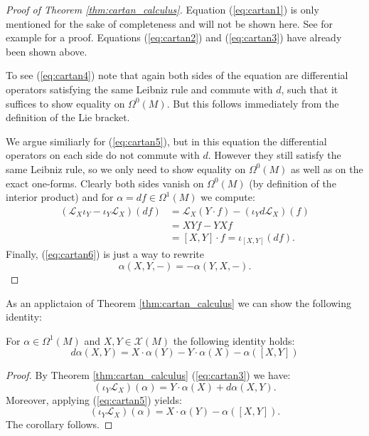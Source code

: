 \begin{proof}[Proof of Theorem \ref{thm:cartan_calculus}]
    Equation (\ref{eq:cartan1}) is only mentioned for the sake of completeness and will not be shown here. See for example \cite{steimle_geometrie} for a proof. Equations (\ref{eq:cartan2}) and (\ref{eq:cartan3}) have already been shown above. 
    
    To see (\ref{eq:cartan4}) note that again both sides of the equation are differential operators satisfying the same Leibniz rule and commute with $d$, such that it suffices to show equality on $\Omega^0(M)$. But this follows immediately from the definition of the Lie bracket.

    We argue similiarly for (\ref{eq:cartan5}), but in this equation the differential operators on each side do not commute with $d$. However they still satisfy the same Leibniz rule, so we only need to show equality on $\Omega^0(M)$ as well as on the exact one-forms. Clearly both sides vanish on $\Omega^0(M)$ (by definition of the interior product) and for $\alpha = df \in \Omega^1(M)$ we compute:
    \begin{align*}
        (\mathcal{L}_X\iota_Y - \iota_Y\mathcal{L}_X)(df) & = \mathcal{L}_X(Y \cdot f) - (\iota_Y d \mathcal{L}_X)(f) \\
        &= XYf - YXf\\
        &= [X,Y] \cdot f = \iota_{[X,Y]}(df).
    \end{align*}
    Finally, (\ref{eq:cartan6}) is just a way to rewrite
    \[
    \alpha(X,Y,-) = -\alpha(Y,X,-).
    \]
\end{proof}

As an applictaion of Theorem \ref{thm:cartan_calculus} we can show the following identity:

\begin{corollary}
    For $\alpha \in \Omega^1(M)$ and $X,Y \in \mathscr{X}(M)$ the following identity holds:
    \[
    d\alpha(X,Y) = X \cdot \alpha(Y) - Y \cdot \alpha(X) - \alpha([X,Y])
    \]
\end{corollary}
\begin{proof}
    By Theorem \ref{thm:cartan_calculus} (\ref{eq:cartan3}) we have:
    \[
    (\iota_Y\mathcal{L}_X)(\alpha) = Y \cdot \alpha(X) + d\alpha(X,Y).
    \]
    Moreover, applying (\ref{eq:cartan5}) yields:
    \[
    (\iota_Y\mathcal{L}_X)(\alpha) = X \cdot \alpha(Y) - \alpha([X,Y]).
    \]
    The corollary follows.
\end{proof}



